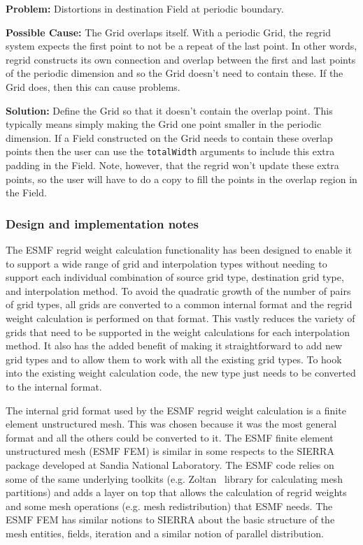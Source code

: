  \bigskip
 
 {\bf Problem:} Distortions in destination Field at periodic boundary.

 \medskip

 {\bf Possible Cause:} The Grid overlaps itself. With a periodic Grid, the regrid system expects
  the first point to not be a repeat of the last point. In other words,
  regrid constructs its own connection and overlap between the first and last points of the
  periodic dimension and so the Grid doesn't need to contain these. If the Grid does, then this
  can cause problems. 

 \smallskip

 {\bf Solution:} Define the Grid so that it doesn't contain the overlap point. This typically means simply making
 the Grid one point smaller in the periodic dimension.  If a Field 
 constructed on the Grid needs to contain these overlap points then the user can use the
 {\tt totalWidth} arguments to include this extra padding in the Field. Note, however, 
 that the regrid won't update these extra points, so the user will have to do a copy to fill the points
 in the overlap region in the Field.  

\subsubsection{Design and implementation notes}

The ESMF regrid weight calculation functionality has been designed to enable it to support a wide range
of grid and interpolation types without needing to support each individual combination of source grid type,
destination grid type, and interpolation method. To avoid the quadratic growth of the number of pairs
of grid types, all grids are converted to a common internal format and the regrid weight calculation
is performed on that format. This vastly reduces the variety of grids that need to be supported in 
the weight calculations for each interpolation method. It also has the added benefit of making it
straightforward to add new grid types and to allow them to work with all the existing grid types.
To hook into the existing weight calculation code, the new type just needs to be converted to the
internal format. 

The internal grid format used by the ESMF regrid weight calculation is a finite element
unstructured mesh. This was chosen because it was the most general format and all the others could be 
converted to it. The ESMF finite element unstructured mesh (ESMF FEM) is similar in some respects to the SIERRA~\cite{Sierra} package 
developed at Sandia National Laboratory. The ESMF code relies on some of the same underlying toolkits (e.g. Zoltan~\cite{Zoltan} library 
for calculating mesh partitions) and adds a layer on top that allows the calculation of regrid weights and some mesh operations 
(e.g. mesh redistribution) that ESMF needs. The ESMF FEM has similar notions to SIERRA about the basic structure of the
mesh entities, fields, iteration and a similar notion of parallel distribution. 


